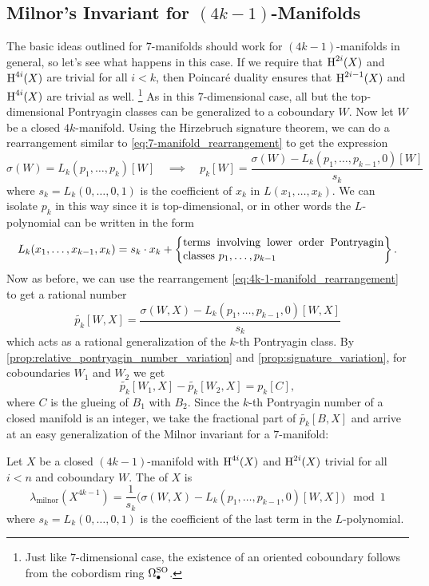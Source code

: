 \subsection*{Milnor's Invariant for $(4k-1)$-Manifolds}

The basic ideas outlined for $7$-manifolds should work for $(4k-1)$-manifolds in general, so let's see what happens in this case. If we require that $\operatorname{H}^{2i}(X)$ and $\operatorname{H}^{4i}(X)$ are trivial for all $i<k$, then Poincar\'e duality ensures that $\operatorname{H}^{2i-1}(X)$ and $\operatorname{H}^{4i}(X)$ are trivial as well. \footnote{Just like $7$-dimensional case, the existence of an oriented coboundary follows from the cobordism ring $\Omega^{\operatorname{SO}}_\bullet$.}
As in this $7$-dimensional case, all but the top-dimensional Pontryagin classes can be generalized to a coboundary $W$.
Now let $W$ be a closed $4k$-manifold. Using the Hirzebruch signature theorem, we can do a rearrangement similar to \cref{eq:7-manifold_rearrangement} to get the expression
\begin{equation}\label{eq:4k-1-manifold_rearrangement}
	\sigma(W) = L_k(p_1, \ldots, p_k)[W]\quad\implies\quad
	p_k[W] = \frac{\sigma(W) - L_k(p_1,\ldots, p_{k-1}, 0)[W]}{s_k}
\end{equation}
where $s_k=L_k(0,\ldots, 0, 1)$ is the coefficient of $x_k$ in $L(x_1,\ldots, x_k)$.
We can isolate $p_k$ in this way since it is top-dimensional, or in other words the $L$-polynomial can be written in the form
\[
	L_k(x_1,\ldots, x_{k-1}, x_k) = s_k\cdot x_k +
	\left\{\parbox{18em}{terms involving lower order Pontryagin classes $p_1,\ldots, p_{k-1}$}\right\}.
\]
Now as before, we can use the rearrangement \cref{eq:4k-1-manifold_rearrangement} to get a rational number
\[
	\widetilde{p_k}[W, X] = \frac{\sigma(W, X) - L_k(p_1,\ldots, p_{k-1}, 0)[W,X]}{s_k}
\]
which acts as a rational generalization of the $k$-th Pontryagin class. By \cref{prop:relative_pontryagin_number_variation} and \cref{prop:signature_variation}, for coboundaries $W_1$ and $W_2$ we get
\[
	\widetilde{p_k}[W_1, X] - \widetilde{p_k}[W_2, X] = p_k[C],
\]
where $C$ is the glueing of $B_1$ with $B_2$. Since the $k$-th Pontryagin number of a closed manifold is an integer, we take the fractional part of $\widetilde{p_k}[B,X]$ and arrive at an easy generalization of the Milnor invariant for a $7$-manifold:

\begin{definition}
	Let $X$ be a closed $(4k-1)$-manifold with $\operatorname{H}^{4i}(X)$ and $\operatorname{H}^{2i}(X)$ trivial for all $i<n$ and coboundary $W$. The  of $X$ is
	\[
		\boxed{
			\lambda_{\mathrm{milnor}}(X^{4k-1}) = \frac{1}{s_k}\Big(\sigma(W, X) - L_k(p_1, \ldots, p_{k-1},0)[W,X]\Big)\mod 1
		}
	\]
	where $s_k = L_k(0,\ldots,0,1)$ is the coefficient of the last term in the $L$-polynomial.
\end{definition}

